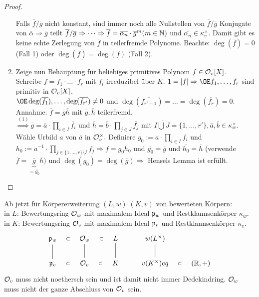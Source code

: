 \begin{proof}
\begin{enumerate}[(1)]
Falls $\overline{f}/\overline{g}$ nicht konstant, sind immer noch alle Nullstellen von $\overline{f}/\overline{g}$ Konjugate von $\overline{\alpha} \Rightarrow \overline{g}$ teilt $\overline{f}/\overline{g} \Rightarrow \dots \Rightarrow \overline{f}=\overline{\alpha_n} \cdot \overline{g}^m (m \in \mathbb{N})$ und $\overline{\alpha_n} \in \kappa^\times_v$. Damit gibt es keine echte Zerlegung von $\overline{f}$ in teilerfremde Polynome. Beachte: $\deg(\overline{f})=0$ (Fall 1) oder $\deg(\overline{f})=\deg(f)$ (Fall 2).
\item Zeige nun Behauptung für beliebiges primitives Polynom $f \in \mathcal{O}_v[X]$.\\
Schreibe $f=f_1 \cdot \ldots \cdot f_r$ mit $f_i$ irreduzibel über $K$. $1=|f| \Rightarrow \OE f_1, \dots, f_r$ sind primitiv in $\mathcal{O}_v[X]$.\\
$\OE \deg(\overline{f_1}), \dots, \deg(\overline{f_{r'}}) \neq 0$ und $\deg(\overline{f_{r'+1}})=\dots=\deg(\overline{f_r})=0.$\\
Annahme: $\overline{f}=\overline{g}\overline{h}$ mit $\overline{g}, \overline{h}$ teilerfremd.\\
$\stackrel{(1)}{\Rightarrow} \overline{g}=\overline{a} \cdot \prod_{i \in I} \overline{f_i}$ und $ \overline{h}=\overline{b} \cdot \prod_{j \in J} \overline{f_j}$ mit $I \dot{\bigcup} J = \{1, \dots, r'\}, \overline{a}, \overline{b} \in \kappa_w^\times$.\\
Wähle Urbild $a$ von $\overline{a}$ in $\mathcal{O}_v^\times.$ Definiere $g_0:=a \cdot \prod_{i \in I} f_i$ und $h_0:= a^{-1}\cdot \prod_{j \in \{1, \dots, r\} \setminus I} f_j \Rightarrow f= g_0h_0$ und $\overline{g_0}=\overline{g}$ und $\overline{h_0}=\overline{h}$ (verwende $\overline{f}=\underbrace{\overline{g}}_{=\overline{g_0}} \overline{h})$ und $\deg(g_0)=\deg(\overline{g}) \Rightarrow$ Hensels Lemma ist erfüllt.
\end{enumerate}
\end{proof}

\begin{Not}
Ab jetzt für Körpererweiterung $(L,w)|(K,v)$ von bewerteten Körpern:\\
in $L$: Bewertungsring $\mathcal{O}_w$ mit maximalem Ideal $\mathfrak{p}_w$ und Restklannsenkörper $\kappa_w$.\\
in $K$: Bewertungsring $\mathcal{O}_v$ mit maximalem Ideal $\mathfrak{p}_v$ und Restklannsenkörper $\kappa_v$.
\[\begin{tikzcd}
\p_w  \arrow[draw=none]{r}[auto=false, sloped]{\subset} & \O_w \arrow[draw=none]{r}[auto=false, sloped]{\subset} & L &w(L^\times)\\
\p_v  \arrow[dash]{u} \arrow[draw=none]{r}[auto=false, sloped]{\subset} & \O_v \arrow[dash]{u} \arrow[draw=none]{r}[auto=false, sloped]{\subset} & K \arrow[dash]{u} & v(K^\times) \arrow[draw=none]{r}[auto=false, sloped]{\subset}eq  \arrow[dash]{u} & (\R,+) 
\end{tikzcd}\]
\danger $\mathcal{O}_v$ muss nicht noethersch sein und ist damit nicht immer Dedekindring. $\mathcal{O}_w$ muss nicht der ganze Abschluss von $\mathcal{O}_v$ sein.
\end{Not}

